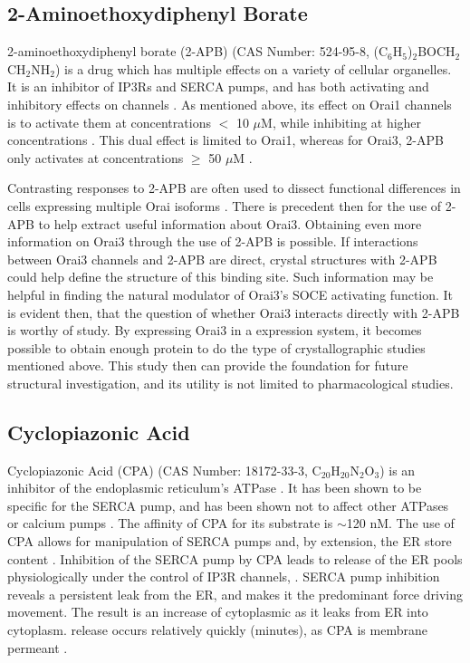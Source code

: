 \subsection{2-Aminoethoxydiphenyl Borate}
2-aminoethoxydiphenyl borate (2-APB) (CAS Number: 524-95-8, (C$_6$H$_5$)$_2$BOCH$_2$CH$_2$NH$_2$) is a drug which has multiple effects on a variety of cellular organelles. It is an inhibitor of IP3Rs and SERCA pumps, and has both activating and inhibitory effects on channels \citep{Prakriya2001, Bilmen2002, Dellis2011}. As mentioned above, its effect on Orai1 channels is to activate them at concentrations $<$ 10 $\mu$M, while inhibiting at higher concentrations \citep{Prakriya2001,Feske2006,Gwack2007,Goto2010}. This dual effect is limited to Orai1, whereas for Orai3, 2-APB only activates at concentrations $\ge$ 50 $\mu$M \citep{Gwack2007}. 

Contrasting responses to 2-APB are often used to dissect functional differences in cells expressing multiple Orai isoforms \citep{Feske2006,Goto2010,Prakriya2006,Zhang2008a}. There is precedent then for the use of 2-APB to help extract useful information about Orai3. Obtaining even more information on Orai3 through the use of 2-APB is possible. If interactions between Orai3 channels and 2-APB are direct, crystal structures with 2-APB could help define the structure of this binding site. Such information may be helpful in finding the natural modulator of Orai3's SOCE activating function. It is evident then, that the question of whether Orai3 interacts directly with 2-APB is worthy of study. By expressing Orai3 in a \droso{} expression system, it becomes possible to obtain enough protein to do the type of crystallographic studies mentioned above. This study then can provide the foundation for future structural investigation, and its utility is not limited to pharmacological studies.

\subsection{Cyclopiazonic Acid}
Cyclopiazonic Acid (CPA) (CAS Number: 18172-33-3, C$_{20}$H$_{20}$N$_2$O$_3$) is an inhibitor of the endoplasmic reticulum's \Ca{} ATPase \citep{Moncoq2007}. It has been shown to be specific for the SERCA pump, and has been shown not to affect other ATPases or calcium pumps \citep{Moncoq2007}. The affinity of CPA for its substrate is $\sim$120 nM. The use of CPA allows for manipulation of SERCA pumps and, by extension, the ER \Ca{} store content \citep[chap. 2]{WPutney:2006p130}. Inhibition of the SERCA pump by CPA leads to release of the ER \Ca{} pools physiologically under the control of IP3R channels, \citep[chap. 2]{WPutney:2006p130}. 
 SERCA pump inhibition reveals a persistent \Ca{} leak from the ER, and makes it the predominant force driving \Ca{} movement. The result is an increase of cytoplasmic \Ca{} as it leaks from ER into cytoplasm. \Ca{} release occurs relatively quickly (minutes), as CPA is membrane permeant \citep{WPutney:2006p130}. 

